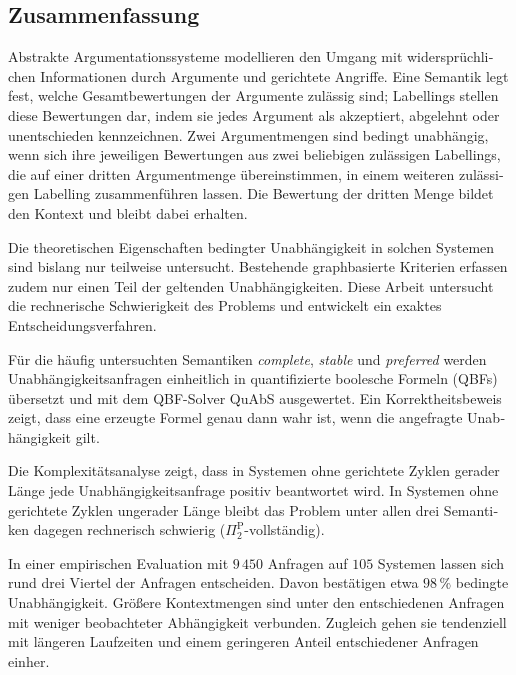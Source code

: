 \begin{otherlanguage}{ngerman}
    \chapter*{Zusammenfassung}

    Abstrakte Argumentationssysteme modellieren den Umgang mit
    widersprüchlichen Informationen durch Argumente und gerichtete Angriffe.
    Eine Semantik legt fest, welche Gesamtbewertungen der Argumente zulässig
    sind; Labellings stellen diese Bewertungen dar, indem sie jedes Argument
    als akzeptiert, abgelehnt oder unentschieden kennzeichnen. Zwei
    Argumentmengen sind bedingt unabhängig, wenn sich ihre jeweiligen
    Bewertungen aus zwei beliebigen zulässigen Labellings, die auf einer
    dritten Argumentmenge übereinstimmen, in einem weiteren zulässigen
    Labelling zusammenführen lassen. Die Bewertung der dritten Menge bildet
    den Kontext und bleibt dabei erhalten.

    Die theoretischen Eigenschaften bedingter Unabhängigkeit in solchen
    Systemen sind bislang nur teilweise untersucht. Bestehende graphbasierte
    Kriterien erfassen zudem nur einen Teil der geltenden Unabhängigkeiten.
    Diese Arbeit untersucht die rechnerische Schwierigkeit des Problems und
    entwickelt ein exaktes Entscheidungsverfahren.

    Für die häufig untersuchten Semantiken \emph{complete}, \emph{stable}
    und \emph{preferred} werden Unabhängigkeitsanfragen einheitlich in
    quantifizierte boolesche Formeln (QBFs) übersetzt und mit dem QBF-Solver
    QuAbS ausgewertet. Ein Korrektheitsbeweis zeigt, dass eine erzeugte Formel
    genau dann wahr ist, wenn die angefragte Unabhängigkeit gilt.

    Die Komplexitätsanalyse zeigt, dass in Systemen ohne gerichtete Zyklen
    gerader Länge jede Unabhängigkeitsanfrage positiv beantwortet wird. In
    Systemen ohne gerichtete Zyklen ungerader Länge bleibt das Problem unter
    allen drei Semantiken dagegen rechnerisch schwierig
    (\(\Pi_2^{\mathrm{P}}\)-vollständig).

    In einer empirischen Evaluation mit \(9\,450\) Anfragen auf \(105\)
    Systemen lassen sich rund drei Viertel der Anfragen entscheiden. Davon
    bestätigen etwa \(98\,\%\) bedingte Unabhängigkeit. Größere Kontextmengen
    sind unter den entschiedenen Anfragen mit weniger beobachteter
    Abhängigkeit verbunden. Zugleich gehen sie tendenziell mit längeren
    Laufzeiten und einem geringeren Anteil entschiedener Anfragen einher.
\end{otherlanguage}
